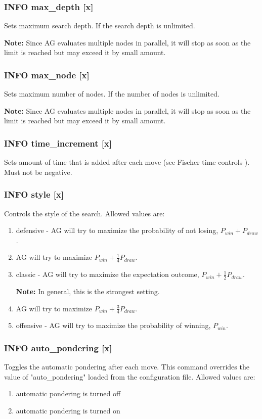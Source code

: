 \documentclass[12pt,a4paper]{article}
\begin{document}
\subsubsection{INFO max{\_}depth [x]}
Sets maximum search depth. If  the search depth is unlimited.

\textbf{Note:} Since AG evaluates multiple nodes in parallel, it will stop as soon as the limit is reached but may exceed it by small amount.

\subsubsection{INFO max{\_}node [x]}
Sets maximum number of nodes. If  the number of nodes is unlimited.

\textbf{Note:} Since AG evaluates multiple nodes in parallel, it will stop as soon as the limit is reached but may exceed it by small amount.

\subsubsection{INFO time{\_}increment [x]}
Sets amount of time that is added after each move (see Fischer time controls \cite{fischer}). Must not be negative.

\subsubsection{INFO style [x]}
Controls the style of the search. Allowed values are:
\begin{enumerate}[leftmargin=7.5em]
	\item[\text{$[x]=0$}]{defensive - AG will try to maximize the probability of not losing, $P_{win} + P_{draw}$.}
	\item[\text{$[x]=1$}]{AG will try to maximize $P_{win} + \frac{1}{4}P_{draw}$.}
	\item[\text{$[x]=2$}]{classic - AG will try to maximize the expectation outcome, $P_{win} + \frac{1}{2}P_{draw}$.
	
	\textbf{Note:} In general, this is the strongest setting.}
	\item[\text{$[x]=3$}]{AG will try to maximize $P_{win} + \frac{3}{4}P_{draw}$.}
	\item[\text{$[x]=4$}]{offensive - AG will try to maximize the probability of winning, $P_{win}$.}
\end{enumerate}

\subsubsection{INFO auto{\_}pondering [x]}
Toggles the automatic pondering after each move. This command overrides the value of "auto{\_}pondering" loaded from the configuration file. Allowed values are:
\begin{enumerate}[leftmargin=7.5em]
	\item[\text{$[x]=0$}]{automatic pondering is turned off}
	\item[\text{$[x]=1$}]{automatic pondering is turned on}
\end{enumerate}
\end{document}
